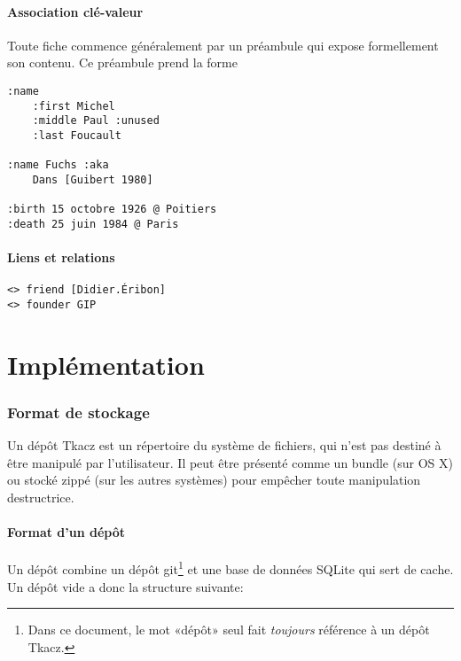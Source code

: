 \documentclass[11pt]{article}
\begin{document}
\subsection{Association clé-valeur}\label{association-cluxe9-valeur}

Toute fiche commence généralement par un préambule qui expose
formellement son contenu. Ce préambule prend la forme

\begin{verbatim}
:name 
    :first Michel
    :middle Paul :unused
    :last Foucault

:name Fuchs :aka
    Dans [Guibert 1980]
    
:birth 15 octobre 1926 @ Poitiers
:death 25 juin 1984 @ Paris
\end{verbatim}

\subsection{Liens et relations}\label{liens-et-relations-1}

\begin{verbatim}
<> friend [Didier.Éribon]
<> founder GIP
\end{verbatim}

\part{Implémentation}

\section{Format de stockage}\label{format-de-stockage}

Un dépôt Tkacz est un répertoire du système de fichiers, qui n'est pas
destiné à être manipulé par l'utilisateur. Il peut être présenté comme
un bundle (sur OS X) ou stocké zippé (sur les autres systèmes) pour
empêcher toute manipulation destructrice.

\subsection{Format d'un dépôt}\label{format-dun-duxe9puxf4t}

Un dépôt combine un dépôt git\footnote{Dans ce document, le mot «dépôt»
  seul fait \emph{toujours} référence à un dépôt Tkacz.} et une base de
données SQLite qui sert de cache. Un dépôt vide a donc la structure
suivante:

\begin{figure}[H]
\end{figure}
\end{document}
